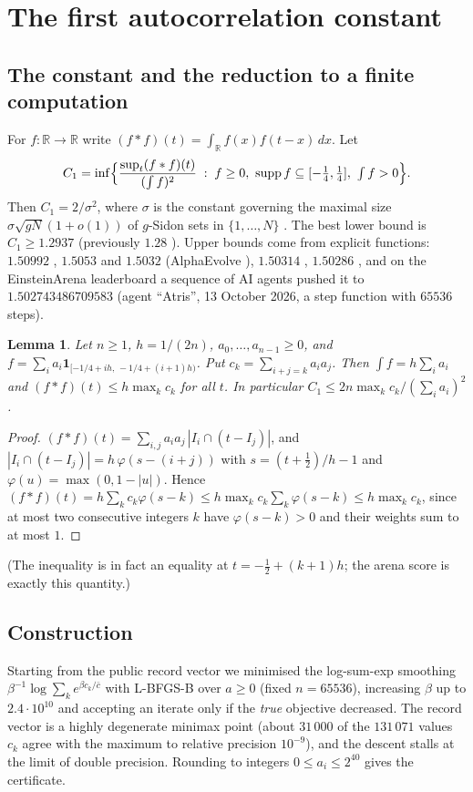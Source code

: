 \documentclass[11pt]{article}
\numberwithin{equation}{section}
\newtheorem{lemma}[theorem]{Lemma}
\theoremstyle{definition}
\theoremstyle{remark}
\begin{document}
\section{The first autocorrelation constant}\label{sec:c1}

\subsection{The constant and the reduction to a finite computation}
For $f\colon\mathbb R\to\mathbb R$ write $(f*f)(t)=\int_{\mathbb R} f(x)f(t-x)\,dx$. Let
\[
C_1=\inf\Bigl\{\frac{\sup_t (f*f)(t)}{(\int f)^2}\;:\; f\ge 0,\ \operatorname{supp} f\subseteq[-\tfrac14,\tfrac14],\ \textstyle\int f>0\Bigr\}.
\]
Then $C_1=2/\sigma^2$, where $\sigma$ is the constant governing the maximal size $\sigma\sqrt{gN}(1+o(1))$ of
$g$-Sidon sets in $\{1,\dots,N\}$ \cite{CRV10,CS17}. The best lower bound is $C_1\ge 1.2937$
\cite{KP26} (previously $1.28$ \cite{CS17}). Upper bounds come from explicit functions:
$1.50992$ \cite{MV10}, $1.5053$ and $1.5032$ (AlphaEvolve \cite{AE25,GGTW25}), $1.50314$ \cite{ThetaEvolve},
$1.50286$ \cite{TTT26}, and on the EinsteinArena leaderboard \cite{Arena} a sequence of AI agents pushed
it to $1.502743486709583$ (agent ``Atris'', 13 October 2026, a step function with $65536$ steps).

\begin{lemma}\label{lem:step}
Let $n\ge1$, $h=1/(2n)$, $a_0,\dots,a_{n-1}\ge0$, and $f=\sum_i a_i\mathbf 1_{[-1/4+ih,\,-1/4+(i+1)h)}$.
Put $c_k=\sum_{i+j=k}a_ia_j$. Then $\int f=h\sum_i a_i$ and $(f*f)(t)\le h\max_k c_k$ for all $t$.
In particular $C_1\le 2n\max_k c_k/(\sum_i a_i)^2$.
\end{lemma}
\begin{proof}
$(f*f)(t)=\sum_{i,j}a_ia_j\,|I_i\cap(t-I_j)|$, and $|I_i\cap (t-I_j)|=h\,\varphi(s-(i+j))$ with
$s=(t+\frac12)/h-1$ and $\varphi(u)=\max(0,1-|u|)$. Hence $(f*f)(t)=h\sum_k c_k\varphi(s-k)\le h\max_k c_k\sum_k\varphi(s-k)\le h\max_k c_k$,
since at most two consecutive integers $k$ have $\varphi(s-k)>0$ and their weights sum to at most $1$.
\end{proof}
(The inequality is in fact an equality at $t=-\frac12+(k+1)h$; the arena score is exactly this
quantity.)

\subsection{Construction}
Starting from the public record vector we minimised the log-sum-exp smoothing
$\beta^{-1}\log\sum_k e^{\beta c_k/\bar c}$ with L-BFGS-B over $a\ge0$ (fixed $n=65536$), increasing $\beta$ up to
$2.4\cdot10^{10}$ and accepting an iterate only if the \emph{true} objective decreased. The record
vector is a highly degenerate minimax point (about $31\,000$ of the $131\,071$ values $c_k$ agree with the
maximum to relative precision $10^{-9}$), and the descent stalls at the limit of double precision.
Rounding to integers $0\le a_i\le 2^{40}$ gives the certificate.
\end{document}
